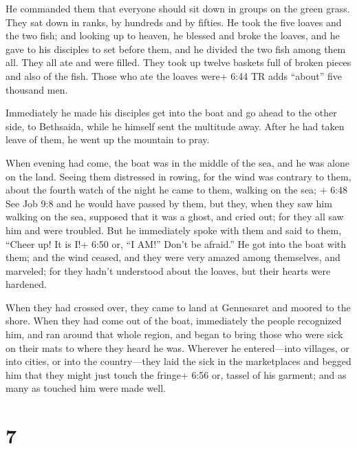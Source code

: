  He commanded them that everyone should sit down in groups
on the green grass.  They sat down in ranks, by hundreds
and by fifties.  He took the five loaves and the two fish;
and looking up to heaven, he blessed and broke the loaves, and he gave
to his disciples to set before them, and he divided the two fish among
them all.  They all ate and were filled.  They
took up twelve baskets full of broken pieces and also of the fish.
 Those who ate the loaves were+ 6:44 TR adds ``about'' five
thousand men.

 Immediately he made his disciples get into the boat and go
ahead to the other side, to Bethsaida, while he himself sent the
multitude away.  After he had taken leave of them, he went
up the mountain to pray.

 When evening had come, the boat was in the middle of the
sea, and he was alone on the land.  Seeing them distressed
in rowing, for the wind was contrary to them, about the fourth watch of
the night he came to them, walking on the sea; + 6:48 See Job 9:8 and he
would have passed by them,  but they, when they saw him
walking on the sea, supposed that it was a ghost, and cried out;
 for they all saw him and were troubled. But he immediately
spoke with them and said to them, ``Cheer up! It is I!+ 6:50 or, ``I
AM!'' Don't be afraid.''  He got into the boat with them;
and the wind ceased, and they were very amazed among themselves, and
marveled;  for they hadn't understood about the loaves, but
their hearts were hardened.

 When they had crossed over, they came to land at
Gennesaret and moored to the shore.  When they had come out
of the boat, immediately the people recognized him,  and
ran around that whole region, and began to bring those who were sick on
their mats to where they heard he was.  Wherever he
entered---into villages, or into cities, or into the country---they laid
the sick in the marketplaces and begged him that they might just touch
the fringe+ 6:56 or, tassel of his garment; and as many as touched him
were made well.

\hypertarget{section-6}{%
\section{7}\label{section-6}}

